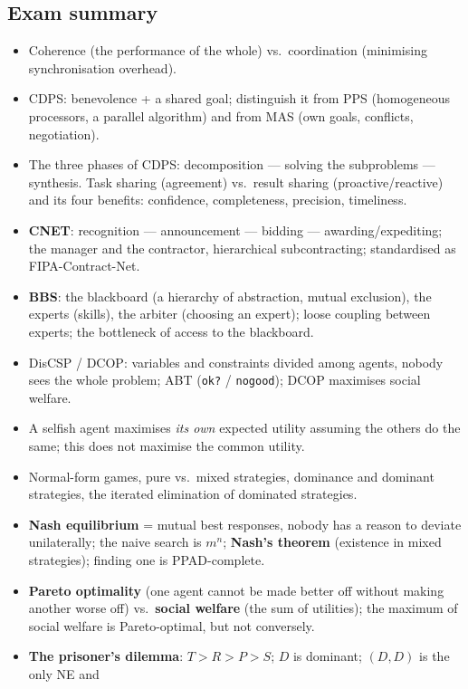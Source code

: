 \documentclass[11pt,a4paper]{article}
\theoremstyle{definition}
\begin{document}
\subsection{Exam summary}

\begin{itemize}
\item Coherence (the performance of the whole) vs.\ coordination (minimising synchronisation
  overhead).
\item CDPS: benevolence + a shared goal; distinguish it from PPS (homogeneous processors, a
  parallel algorithm) and from MAS (own goals, conflicts, negotiation).
\item The three phases of CDPS: decomposition --- solving the subproblems --- synthesis. Task
  sharing (agreement) vs.\ result sharing (proactive/reactive) and its four benefits:
  confidence, completeness, precision, timeliness.
\item \textbf{CNET}: recognition --- announcement --- bidding --- awarding/expediting; the
  manager and the contractor, hierarchical subcontracting; standardised as FIPA-Contract-Net.
\item \textbf{BBS}: the blackboard (a hierarchy of abstraction, mutual exclusion), the experts
  (skills), the arbiter (choosing an expert); loose coupling between experts; the bottleneck of
  access to the blackboard.
\item DisCSP / DCOP: variables and constraints divided among agents, nobody sees the whole
  problem; ABT (\texttt{ok?} / \texttt{nogood}); DCOP maximises social welfare.
\item A selfish agent maximises \emph{its own} expected utility assuming the others do the same;
  this does not maximise the common utility.
\item Normal-form games, pure vs.\ mixed strategies, dominance and dominant strategies, the
  iterated elimination of dominated strategies.
\item \textbf{Nash equilibrium} = mutual best responses, nobody has a reason to deviate
  unilaterally; the naive search is $m^n$; \textbf{Nash's theorem} (existence in mixed
  strategies); finding one is PPAD-complete.
\item \textbf{Pareto optimality} (one agent cannot be made better off without making another
  worse off) vs.\ \textbf{social welfare} (the sum of utilities); the maximum of social welfare
  is Pareto-optimal, but not conversely.
\item \textbf{The prisoner's dilemma}: $T>R>P>S$; $D$ is dominant; $(D,D)$ is the only NE and

\end{itemize}
\end{document}
